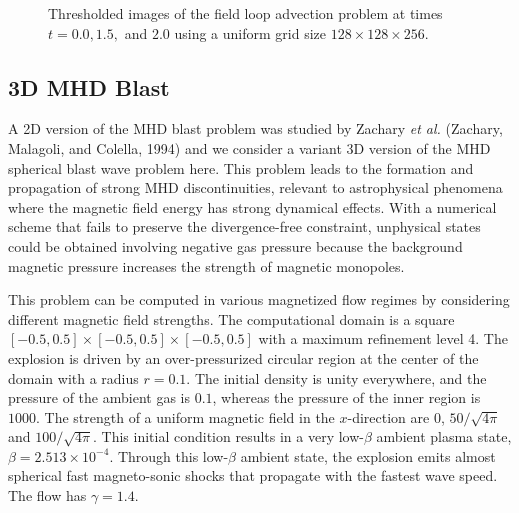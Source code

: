 \begin{figure}[htbp]
{\vskip-0.2in}
\begin{center}
    {\subfigure[$B_p$ at $t=0.0$]{\texttt{[image: FL3d\_t0p00000]}}}
    {\subfigure[$B_p$ at $t=1.5$]{\texttt{[image: FL3d\_t1p50000]}}}
    {\subfigure[$B_p$ at $t=2.0$]{\texttt{[image: FL3d\_t2p00001]}}}
\end{center}
\caption{Thresholded images of the field loop advection problem at times $t=0.0, 1.5,$ and $2.0$ using a uniform grid size $128\times128\times256$.}
\label{FieldLoopAdvect3D}
\end{figure}


\subsection{3D MHD Blast}
\label{Sec:SimulationBlastBS3D}
A 2D version of the MHD blast problem was studied by Zachary {\em et al.} (Zachary, Malagoli, and Colella, 1994) and we consider
a variant 3D version of the MHD spherical blast wave problem here. This problem leads to the formation and propagation of strong MHD discontinuities, relevant to astrophysical phenomena where the magnetic field energy has strong dynamical effects. With a numerical scheme that fails to preserve the divergence-free constraint, unphysical states could be obtained involving negative gas pressure because the background magnetic pressure increases the strength of magnetic monopoles.

This problem can be computed in various magnetized flow regimes by considering 
different magnetic field strengths. The computational domain is a square $[-0.5, 0.5]\times[-0.5,0.5]\times[-0.5,0.5]$ with a maximum refinement level 4. The explosion is driven by an over-pressurized circular region at the center of the domain with a radius $r=0.1$. The initial density is unity everywhere, and the pressure of the ambient gas is $0.1$, whereas
the pressure of the inner region is $1000$. The strength of a uniform magnetic field in the $x$-direction are $0$, $50/\sqrt{4\pi}$ and $100/\sqrt{4\pi}$. This initial condition results in a very low-$\beta$ ambient plasma state, $\beta=2.513\times10^{-4}$. Through this low-$\beta$ ambient state, the explosion emits almost spherical fast magneto-sonic shocks that propagate with the fastest wave speed. The flow has $\gamma=1.4$.

